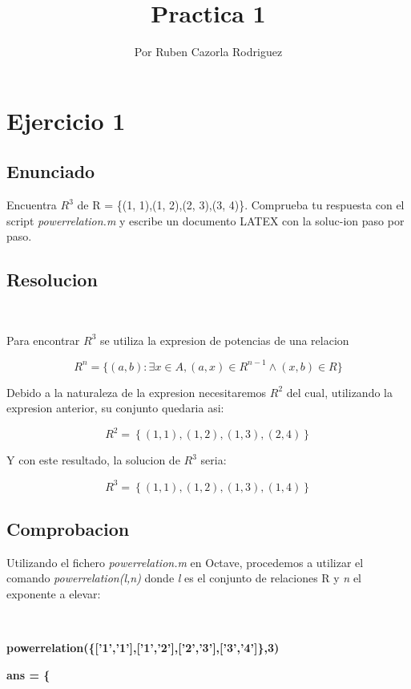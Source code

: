 \documentclass[english]{article}
\begin{document}
\title{Practica 1}
\author{Por Ruben Cazorla Rodriguez}
\maketitle

\section{{\LARGE{}Ejercicio 1}}

\subsection{{\Large{}Enunciado}}

Encuentra $R^{3}$ de R = \{(1, 1),(1, 2),(2, 3),(3, 4)\}. Comprueba
tu respuesta con el script \textit{powerrelation.m }y escribe un documento
LATEX con la soluc-ion paso por paso.

\subsection{{\Large{}Resolucion}}

\ 

Para encontrar $R^{3}$ se utiliza la expresion de potencias de una
relacion

\[
R^{n}=\{(a,b):\exists x\in A,(a,x)\in R^{n-1}\wedge(x,b)\in R\}
\]

Debido a la naturaleza de la expresion necesitaremos $R^{2}$ del cual,
utilizando la expresion anterior, su conjunto quedaria asi:

\[
R^{2}=\left\{ (1,1),(1,2),(1,3),(2,4)\right\} 
\]

Y con este resultado, la solucion de $R^{3}$ seria:

\[
R^{3}=\left\{ (1,1),(1,2),(1,3),(1,4)\right\} 
\]


\subsection{{\Large{}Comprobacion}}

Utilizando el fichero \textit{powerrelation.m }en Octave, procedemos
a utilizar el comando \textit{powerrelation(l,n) }donde \textit{l
}es el conjunto de relaciones R y \textit{n }el exponente a elevar:

\ 

\textbf{powerrelation(\{{[}'1','1'{]},{[}'1','2'{]},{[}'2','3'{]},{[}'3','4'{]}\},3) }

\textbf{ans = \{ }
\end{document}
